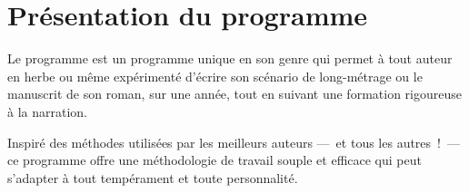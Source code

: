% 
% 
% 
% 
% 
% 
% 
% 

\section{Présentation du programme}\hypertarget{presentation-programme}{}\label{presentation-programme}

Le programme \unan{} est un programme unique en son genre qui permet à tout auteur en herbe ou même expérimenté d'écrire son scénario de long-métrage ou le manuscrit de son roman, sur une année, tout en suivant une formation rigoureuse à la narration.

Inspiré des méthodes utilisées par les meilleurs auteurs —~{}et tous les autres~{}!~{}— ce programme offre une méthodologie de travail souple et efficace qui peut s'adapter à tout tempérament et toute personnalité.

